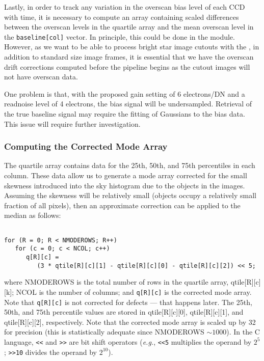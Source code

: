 Lastly, in order to track any variation in the overscan bias
level of each CCD with time, it is necessary to compute an
array containing scaled differences between the overscan
levels in the quartile array
and the mean overscan level in the {\tt baseline[col]} vector.
In principle, this could be done in the \cfrm module. However,
as we want to be able to process bright star image cutouts
with the \cfrm, in addition to standard size image frames,
it is essential that we have the overscan drift corrections
computed before the pipeline begins as the cutout images
will not have overscan data.

One problem is that, with the proposed gain setting
of 6 electrons/DN and a readnoise level of 4 electrons, the bias signal 
will be undersampled. Retrieval of the true baseline signal
may require the fitting of Gaussians to the bias data. This issue
will require further investigation.

\subsubsection{Computing the Corrected Mode Array}
 
The quartile array contains
data for the 25th, 50th, and 75th percentiles 
in each column. These data allow 
us to generate a mode array corrected for the small
skewness introduced into the sky histogram
due to the objects in the images. 
Assuming the skewness will be relatively small (objects
occupy a relatively small fraction of all pixels), then
an approximate correction can be applied to the median
as follows:

\begin{verbatim}

for (R = 0; R < NMODEROWS; R++) 
   for (c = 0; c < NCOL; c++)
      q[R][c] = 
         (3 * qtile[R][c][1] - qtile[R][c][0] - qtile[R][c][2]) << 5;

\end{verbatim}

\noindent where NMODEROWS is the total number of rows in the
quartile array, qtile[R][c][k]; NCOL is the number of columns;
and {\tt q[R][c]} is the corrected mode array. Note that {\tt q[R][c]}
is not corrected for defects --- that happens later.
The 25th, 50th, and 75th percentile values are stored in
qtile[R][c][0], qtile[R][c][1], and qtile[R][c][2],
respectively. Note that the corrected mode array is scaled up
by 32 for precision (this is statistically adequate since 
NMODEROWS $\sim 1000$). In the C language, 
{\tt <<} and {\tt >>} are bit shift
operators ({\it e.g.}, {\tt <<5} multiplies the operand by $2^{5}$;
{\tt >>10} divides the operand by $2^{10}$). 

